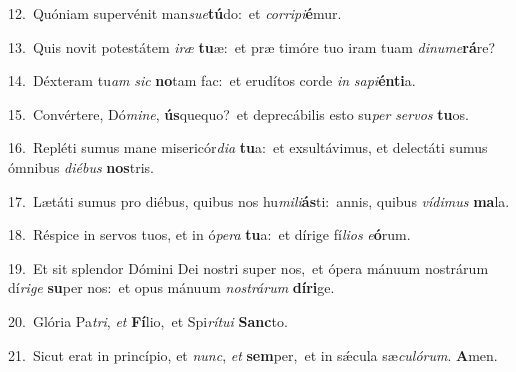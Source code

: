 {\numbfont\textcolor{\numbcolor}{12.}}~Quóniam supervénit man\-\textit{su}\-\textit{e}\textbf{tú}do:~\star et \textit{cor}\-\textit{ri}\textit{pi}\textbf{é}mur.\par
{\numbfont\textcolor{\numbcolor}{13.}}~Quis novit potestátem \textit{i}\-\textit{ræ} \textbf{tu}\-æ:~\star et præ timóre tuo iram tuam \textit{di}\-\textit{nu}\textit{me}\textbf{rá}re?\par
{\numbfont\textcolor{\numbcolor}{14.}}~Déxteram tu\textit{am} \textit{sic} \textbf{no}\-tam fac:~\star et erudítos corde \textit{in} \textit{sa}\-\textit{pi}\textbf{én}\textbf{ti}a.\par
{\numbfont\textcolor{\numbcolor}{15.}}~Convértere, Dó\-\textit{mi}\-\textit{ne}, \textbf{ús}\-quequo?~\star et deprecábilis esto su\textit{per} \textit{ser}\-\textit{vos} \textbf{tu}\-os.\par
{\numbfont\textcolor{\numbcolor}{16.}}~Repléti sumus mane misericór\-\textit{di}\-\textit{a} \textbf{tu}\-a:~\star et exsultávimus, et delectáti sumus ómnibus \textit{di}\-\textit{é}\textit{bus} \textbf{nos}\-tris.\par
{\numbfont\textcolor{\numbcolor}{17.}}~Lætáti sumus pro diébus, quibus nos hu\-\textit{mi}\-\textit{li}\textbf{ás}ti:~\star annis, quibus \textit{ví}\-\textit{di}\textit{mus} \textbf{ma}\-la.\par
{\numbfont\textcolor{\numbcolor}{18.}}~Réspice in servos tuos, et in ó\-\textit{pe}\-\textit{ra} \textbf{tu}\-a:~\star et dírige fí\-\textit{li}\-\textit{os} \textit{e}\-\textbf{ó}rum.\par
{\numbfont\textcolor{\numbcolor}{19.}}~Et sit splendor Dómini Dei nostri super nos,~\dagger et ópera mánuum nostrárum dí\-\textit{ri}\-\textit{ge} \textbf{su}\-per nos:~\star et opus mánuum \textit{nos}\-\textit{trá}\textit{rum} \textbf{dí}\-\textbf{ri}ge.\par
{\numbfont\textcolor{\numbcolor}{20.}}~Glória Pa\-\textit{tri}\-, \textit{et} \textbf{Fí}\-lio,~\star et Spi\-\textit{rí}\-\textit{tu}\textit{i} \textbf{Sanc}\-to.\par
{\numbfont\textcolor{\numbcolor}{21.}}~Sicut erat in princípio, et \textit{nunc}\-, \textit{et} \textbf{sem}\-per,~\star et in sǽcula sæ\-\textit{cu}\-\textit{ló}\textit{rum}. \textbf{A}\-men.\par
